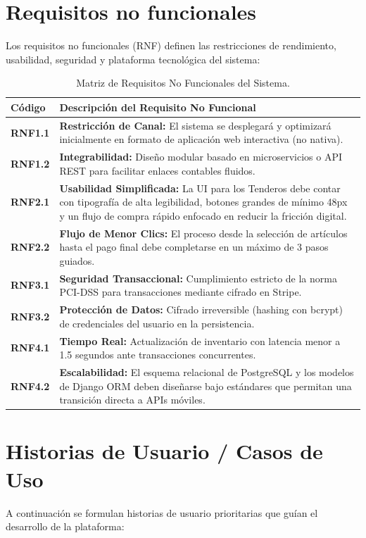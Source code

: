 \documentclass[12pt,spanish,a4paper]{report}
\begin{document}
\newpage
\section{Requisitos no funcionales}
Los requisitos no funcionales (RNF) definen las restricciones de rendimiento, usabilidad, seguridad y plataforma tecnológica del sistema:

\begin{table}[h!]
\centering
\small
\begin{tabular}{p{2cm} p{12cm}}
\toprule
\textbf{Código} & \textbf{Descripción del Requisito No Funcional} \\
\midrule
\textbf{RNF1.1} & \textbf{Restricción de Canal:} El sistema se desplegará y optimizará inicialmente en formato de aplicación web interactiva (no nativa). \\
\textbf{RNF1.2} & \textbf{Integrabilidad:} Diseño modular basado en microservicios o API REST para facilitar enlaces contables fluidos. \\
\textbf{RNF2.1} & \textbf{Usabilidad Simplificada:} La UI para los Tenderos debe contar con tipografía de alta legibilidad, botones grandes de mínimo 48px y un flujo de compra rápido enfocado en reducir la fricción digital. \\
\textbf{RNF2.2} & \textbf{Flujo de Menor Clics:} El proceso desde la selección de artículos hasta el pago final debe completarse en un máximo de 3 pasos guiados. \\
\textbf{RNF3.1} & \textbf{Seguridad Transaccional:} Cumplimiento estricto de la norma PCI-DSS para transacciones mediante cifrado en Stripe. \\
\textbf{RNF3.2} & \textbf{Protección de Datos:} Cifrado irreversible (hashing con bcrypt) de credenciales del usuario en la persistencia. \\
\textbf{RNF4.1} & \textbf{Tiempo Real:} Actualización de inventario con latencia menor a 1.5 segundos ante transacciones concurrentes. \\
\textbf{RNF4.2} & \textbf{Escalabilidad:} El esquema relacional de PostgreSQL y los modelos de Django ORM deben diseñarse bajo estándares que permitan una transición directa a APIs móviles. \\
\bottomrule
\end{tabular}
\caption{Matriz de Requisitos No Funcionales del Sistema.}
\label{tab:rnf}
\end{table}

\section{Historias de Usuario / Casos de Uso}
A continuación se formulan historias de usuario prioritarias que guían el desarrollo de la plataforma:
\end{document}
